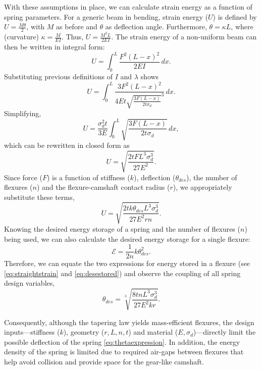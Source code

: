 \documentclass[letterpaper, 10 pt, conference]{ieeeconf} %
\begin{document}
With these assumptions in place, we can calculate strain energy as a function of spring parameters. For a generic beam in bending, strain energy ($U$) is defined by $U = \frac{M\theta}{2}$, with $M$ as before and $\theta$ as deflection angle. Furthermore, $\theta = {\kappa}L$, where (curvature) $\kappa = \frac{M}{EI}$. Thus,  $U = \frac{M^2L}{2EI}$. The strain energy of a non-uniform beam can then be written in integral form:
\begin{equation}
    U = \int_{0}^{L} \frac{F^2(L-x)^2}{2EI}\,dx.
\end{equation}
Substituting previous definitions of $I$ and $\lambda$ shows 
\begin{equation}
    U = \int_{0}^{L} \frac{3F^2(L-x)^2}{4Et{\sqrt{\frac{3F(L-x)}{2t\sigma_d}}}^3}\,dx.
\end{equation}
Simplifying,
\begin{equation}
    U = \frac{\sigma_d^2t}{3E}\int_{0}^{L} \sqrt{\frac{3F(L-x)}{2t\sigma_d}}\,dx,
    \label{eqn:prestraightstrain}
\end{equation}
which can be rewritten in closed form as
\begin{equation}
    U = \sqrt{\frac{2tFL^3\sigma_d^3}{27E^2}}.
\end{equation}
Since force ($F$) is a function of stiffness ($k$), deflection ($\theta_{des}$), the number of flexures ($n$) and the flexure-camshaft contact radius ($r$), we appropriately substitute these terms,
\begin{equation}
    U = \sqrt{\frac{2tk{\theta_{des}}L^3\sigma_d^3}{27E^2rn}}.
    \label{eq:straightstrain}
\end{equation}
Knowing the desired energy storage of a spring and the number of flexures ($n$) being used, we can also calculate the desired energy storage for a single flexure:
\begin{equation}
    \mathcal{E} = \frac{1}{2n}k\theta_{des}^2.
    \label{eq:desestored}
\end{equation}
Therefore, we can equate the two expressions for energy stored in a flexure (see \eqref{eq:straightstrain} and \eqref{eq:desestored}) and observe the coupling of all spring design variables,
\begin{equation}
    \theta_{des} = \sqrt[3]{\frac{8tnL^3\sigma_d^3}{27E^2kr}}.
    \label{eq:thetaexpression}
\end{equation}

Consequently, although the tapering law yields mass-efficient flexures, the design inputs---stiffness ($k$), geometry ($r, L, n, t$) and material ($E, \sigma_d$)---directly limit the possible deflection of the spring \eqref{eq:thetaexpression}. In addition, the energy density of the spring is limited due to required air-gaps between flexures that help avoid collision and provide space for the gear-like camshaft. 
\end{document}
